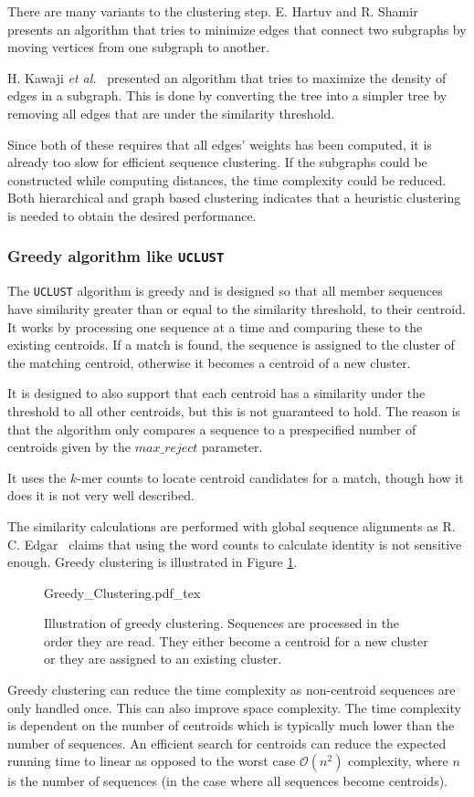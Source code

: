 There are many variants to the clustering step. E. Hartuv and R.
Shamir~\cite{hartuv} presents an algorithm that tries to minimize edges that
connect two subgraphs by moving vertices from one subgraph to another.

H. Kawaji \textit{et al.}~\cite{kawaji} presented an algorithm that tries to
maximize the density of edges in a subgraph. This is done by converting the
tree into a simpler tree by removing all edges that are under the similarity
threshold.

Since both of these requires that all edges' weights has been computed, it is
already too slow for efficient sequence clustering. If the subgraphs could be
constructed while computing distances, the time complexity could be reduced.
Both hierarchical and graph based clustering indicates that a heuristic
clustering is needed to obtain the desired performance.


\subsubsection{Greedy algorithm like \texttt{UCLUST}}

The \texttt{UCLUST} algorithm is greedy and is designed so that all member
sequences have similarity greater than or equal to the similarity threshold,
to their centroid.  It works by processing one sequence at a time and
comparing these to the existing centroids. If a match is found, the sequence
is assigned to the cluster of the matching centroid, otherwise it becomes a
centroid of a new cluster.

It is designed to also support that each centroid has a similarity under the
threshold to all other centroids, but this is not guaranteed to hold. The
reason is that the algorithm only compares a sequence to a prespecified number
of centroids given by the $max\_reject$ parameter.

It uses the $k$-mer counts to locate centroid candidates for a match, though
how it does it is not very well described.

The similarity calculations are performed with global sequence alignments as R.
C. Edgar~\cite{usearch_algorithm}  claims that using the word counts to
calculate identity is not sensitive enough. Greedy clustering is illustrated in
Figure \ref{fig:greedy_clustering}.

\begin{figure}[H]
  \def\svgwidth{\columnwidth}
  {Greedy_Clustering.pdf_tex}
  \caption{Illustration of greedy clustering. Sequences are processed in the
    order they are read. They either become a centroid for a new cluster or
    they are assigned to an existing cluster.}
  \label{fig:greedy_clustering}
\end{figure}

Greedy clustering can reduce the time complexity as non-centroid sequences are
only handled once. This can also improve space complexity. The time complexity
is dependent on the number of centroids which is typically much lower than the
number of sequences. An efficient search for centroids can reduce the expected
running time to linear as opposed to the worst case $\mathcal{O}(n^2)$
complexity, where $n$ is the number of sequences (in the case where all
sequences become centroids).
